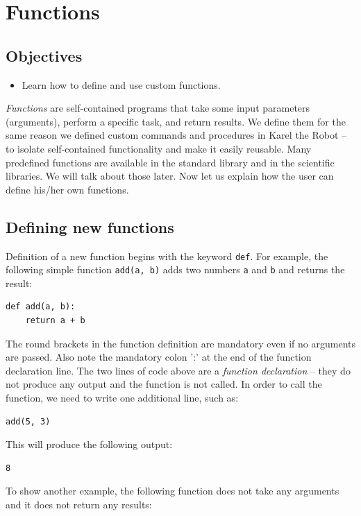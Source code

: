 \section{Functions}

\subsection{Objectives}

\begin{itemize}
\item Learn how to define and use custom functions.
\end{itemize}
{\em Functions} are self-contained programs that take some input parameters (arguments), 
perform a specific task,
and return results. We define them for the same reason we defined custom commands and procedures 
in Karel the Robot -- to isolate self-contained functionality and make it easily reusable.
Many predefined functions are available in the standard library and in the scientific libraries. 
We will talk about those later. Now let us explain how the user can define his/her own functions.

\subsection{Defining new functions}

Definition of a new function begins with the keyword {\tt def}. For example, 
the following simple function {\tt add(a, b)} adds two numbers {\tt a} and {\tt b} 
and returns the result:

\begin{verbatim}
def add(a, b):
    return a + b
\end{verbatim}
The round brackets in the function definition are mandatory even if no arguments are passed.
Also note the mandatory colon ':' at the end of the function declaration line. The two lines of code above 
are a {\em function declaration} -- they do not produce any output and the function is not called. 
In order to call the function, we need to write one additional line, such as:

\begin{verbatim}
add(5, 3)
\end{verbatim}
This will produce the following output:

\begin{verbatim}
8
\end{verbatim}
To show another example, the following function does not take any arguments 
and it does not return any results:

